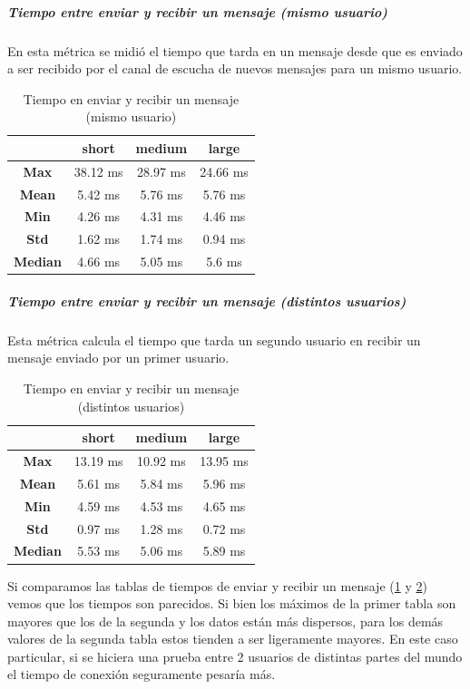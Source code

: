 \subparagraph{Tiempo entre enviar y recibir un mensaje (mismo usuario)}

En esta métrica se midió el tiempo que tarda en un mensaje desde que es enviado a ser recibido por el canal de escucha de nuevos mensajes para un mismo usuario.

\setlength\tabcolsep{10pt}
\begin{table}[H]
    \centering
    \begin{tabular}{|*4{c|}}
    \hline
     & \textbf{short} & \textbf{medium} & \textbf{large} \\
    \hline
    \textbf{Max} & 38.12 ms & 28.97 ms & 24.66 ms \\
    \hline
    \textbf{Mean} & 5.42 ms & 5.76 ms & 5.76 ms \\
    \hline
    \textbf{Min} & 4.26 ms & 4.31 ms & 4.46 ms \\
    \hline
    \textbf{Std} & 1.62 ms & 1.74 ms & 0.94 ms \\
    \hline
    \textbf{Median} & 4.66 ms & 5.05 ms & 5.6 ms \\
    \hline
    \end{tabular}
    \caption{Tiempo en enviar y recibir un mensaje (mismo usuario)}
    \label{tab:tiempo-send-recv-same-user}
\end{table}

\subparagraph{Tiempo entre enviar y recibir un mensaje (distintos usuarios)}

Esta métrica calcula el tiempo que tarda un segundo usuario en recibir un mensaje enviado por un primer usuario.

\setlength\tabcolsep{10pt}
\begin{table}[H]
    \centering
    \begin{tabular}{|*4{c|}}
    \hline
     & \textbf{short} & \textbf{medium} & \textbf{large} \\
    \hline
    \textbf{Max} & 13.19 ms & 10.92 ms & 13.95 ms \\
    \hline
    \textbf{Mean} & 5.61 ms & 5.84 ms & 5.96 ms \\
    \hline
    \textbf{Min} & 4.59 ms & 4.53 ms & 4.65 ms \\
    \hline
    \textbf{Std} & 0.97 ms & 1.28 ms & 0.72 ms \\
    \hline
    \textbf{Median} & 5.53 ms & 5.06 ms & 5.89 ms \\
    \hline
    \end{tabular}
    \caption{Tiempo en enviar y recibir un mensaje (distintos usuarios)}
    \label{tab:tiempo-send-recv-diff-user}
\end{table}

Si comparamos las tablas de tiempos de enviar y recibir un mensaje (\ref{tab:tiempo-send-recv-same-user} y \ref{tab:tiempo-send-recv-diff-user}) vemos que los tiempos son parecidos. Si bien los máximos de la primer tabla son mayores que los de la segunda y los datos están más dispersos, para los demás valores de la segunda tabla estos tienden a ser ligeramente mayores. En este caso particular, si se hiciera una prueba entre 2 usuarios de distintas partes del mundo el tiempo de conexión seguramente pesaría más.
